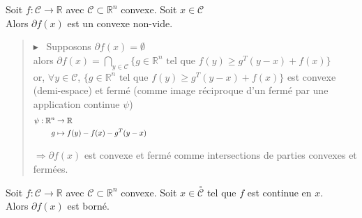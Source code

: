 \documentclass[12pt,a4paper]{article}
\newcommand{\propriete}[2]{%
    \begin{tcolorbox}[colback=white,colframe=green!25!white,title=\textbf{Propriété #1}, coltitle=black]
        #2
    \end{tcolorbox}
}
\newcommand{\preuve}[1]{%
    \begin{quote}
        $\blacktriangleright$~#1
    \end{quote}
}
\begin{document}
\propriete{}{
    Soit $f : \mathcal{C} \rightarrow \mathbb{R}$ avec $\mathcal{C} \subset \mathbb{R}^n$ convexe.
    Soit $x \in \mathcal{C}$\\
    Alors $\partial f(x)$ est un convexe non-vide.
}

\preuve{
    Supposons $\partial f(x) = \emptyset$\\
alors $\partial f(x) = \bigcap_{y \in \mathcal{C}} \{g \in \mathbb{R}^n \text{ tel que } f(y) \geq g^T(y - x) + f(x)\}$\\

or, $\forall y \in \mathcal{C}$, $\{g \in \mathbb{R}^n \text{ tel que } f(y) \geq g^T(y - x) + f(x)\}$ est convexe (demi-espace) et fermé (comme image réciproque d'un fermé par une application continue $\psi$)
\begin{align*}
    \psi : \mathbb{R}^n &\rightarrow \mathbb{R} \hspace{14.5cm}\\
    g &\mapsto f(y) - f(x) - g^T(y - x)
\end{align*}

$\Rightarrow \partial f(x)$ est convexe et fermé comme intersections de parties convexes et fermées.\\
}


\propriete{}{
    Soit $f : \mathcal{C} \rightarrow \mathbb{R}$ avec $\mathcal{C} \subset \mathbb{R}^n$ convexe.
    Soit $x \in \overset{\circ}{\mathcal{C}}$ tel que $f$ est continue en $x$.\\
    Alors $\partial f(x)$ est borné.
}
\end{document}
